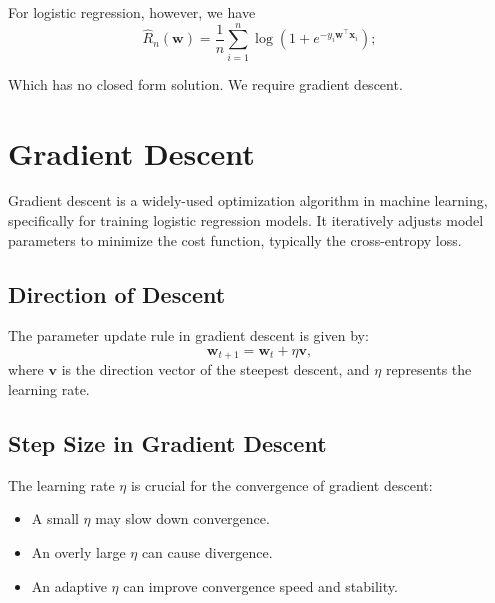 For logistic regression, however, we have 
\[
\widehat R_n(\mathbf{w})=\frac1n\sum_{i=1}^n\log\left(1+e^{-y_i\mathbf{w}^\top\mathbf{x}_i}\right);
\]

Which has no closed form solution. We require gradient descent.

\section{Gradient Descent}

Gradient descent is a widely-used optimization algorithm in machine learning, specifically for training logistic regression models. It iteratively adjusts model parameters to minimize the cost function, typically the cross-entropy loss.

\subsection{Direction of Descent}
The parameter update rule in gradient descent is given by:
\[ \mathbf{w}_{t+1} = \mathbf{w}_t + \eta\mathbf{v}, \]
where \( \mathbf{v} \) is the direction vector of the steepest descent, and \( \eta \) represents the learning rate.

\subsection{Step Size in Gradient Descent}
The learning rate \( \eta \) is crucial for the convergence of gradient descent:
\begin{itemize}
    \item A small \( \eta \) may slow down convergence.
    \item An overly large \( \eta \) can cause divergence.
    \item An adaptive \( \eta \) can improve convergence speed and stability.
\end{itemize}



